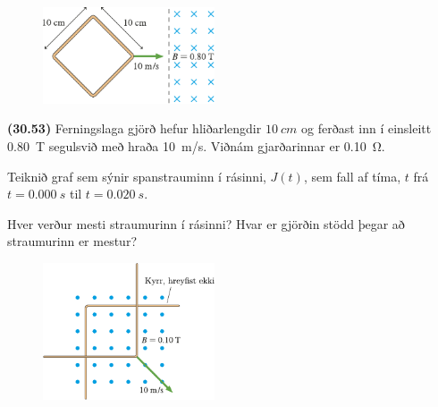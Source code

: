 \begin{enumerate}[label = \textbf{(\alph*)}]

\begin{minipage}{\linewidth}
\begin{figure}
\vspace{-0.75cm}
\includegraphics[width = 2in]{figures/rk3053b.pdf}
\end{figure}

\item[\textbf{(30.53)}] Ferningslaga gjörð hefur hliðarlengdir $ \SI{10}{cm}$ og ferðast inn í einsleitt \SI{0.80}{T} segulsvið með hraða \SI{10}{m/s}. Viðnám gjarðarinnar er \SI{0.10}{\ohm}. \begin{enumerate*}[label = \textbf{(\alph*)}]
    \item Teiknið graf sem sýnir spanstrauminn í rásinni, $J(t)$, sem fall af tíma, $t$ frá $t = \SI{0.000}{s}$ til $t = \SI{0.020}{s}$.
    \item Hver verður mesti straumurinn í rásinni? Hvar er gjörðin stödd þegar að straumurinn er mestur?
\end{enumerate*}

\end{minipage}

\vspace{0.3cm}

\begin{minipage}{\linewidth}
\begin{figure}
\vspace{-0.25cm}
\includegraphics[width = 2in]{figures/rk3054.pdf}
\end{figure}


\end{minipage}
\end{enumerate}
